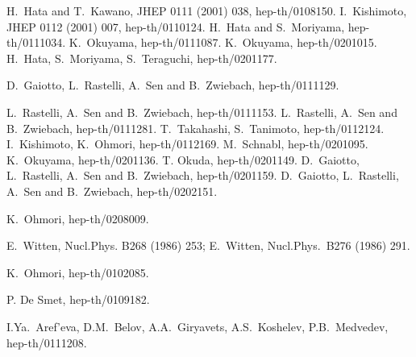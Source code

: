 \documentclass[a4paper,12pt]{article}
\begin{document}
{\begin{thebibliography}{99}
 H.~Hata and T.~Kawano,
 JHEP 0111 (2001) 038, hep-th/0108150.
I.~Kishimoto,
 JHEP 0112 (2001)
007, hep-th/0110124.
H.~Hata and S.~Moriyama,
 hep-th/0111034.
K.~Okuyama,
hep-th/0111087.
K.~Okuyama,
 hep-th/0201015.
H.~Hata, S.~Moriyama, S.~Teraguchi,
 hep-th/0201177.


 D.~Gaiotto, L.~Rastelli, A.~Sen and B.~Zwiebach,
 hep-th/0111129.


 L.~Rastelli, A.~Sen and B.~Zwiebach,
 hep-th/0111153.
L.~Rastelli, A.~Sen and B.~Zwiebach,
 hep-th/0111281.
T.~Takahashi, S.~Tanimoto,
hep-th/0112124.
I.~Kishimoto, K.~Ohmori,
 hep-th/0112169.
M.~Schnabl,
 hep-th/0201095.
K.~Okuyama,
 hep-th/0201136.
T. Okuda,
hep-th/0201149.
D.~Gaiotto, L.~Rastelli, A.~Sen and B.~Zwiebach,
 hep-th/0201159.
D.~Gaiotto, L.~Rastelli, A.~Sen and B.~Zwiebach,
 hep-th/0202151.

 K.~Ohmori,
 hep-th/0208009.



 E.~Witten,
Nucl.Phys. B268 (1986) 253;
E.~Witten,
Nucl.Phys.~B276 (1986) 291.



K.~Ohmori,  hep-th/0102085.


 P. De Smet,
 hep-th/0109182.


 I.Ya.~Aref'eva, D.M.~Belov, A.A.~Giryavets, A.S.~Koshelev,
P.B.~Medvedev, hep-th/0111208.




\end{thebibliography}}
\end{document}
